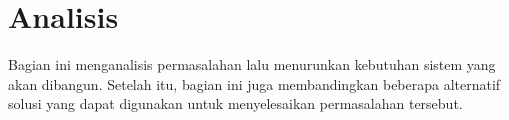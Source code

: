 \section{Analisis}

Bagian ini menganalisis permasalahan lalu menurunkan kebutuhan sistem yang akan dibangun. Setelah itu, bagian ini juga membandingkan beberapa alternatif solusi yang dapat digunakan untuk menyelesaikan permasalahan tersebut.





